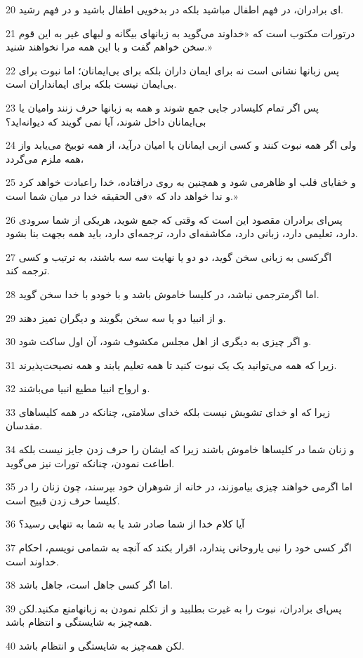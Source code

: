 \par 20 ‌ای برادران، در فهم اطفال مباشید بلکه در بدخویی اطفال باشید و در فهم رشید.
\par 21 درتورات مکتوب است که «خداوند می‌گوید به زبانهای بیگانه و لبهای غیر به این قوم سخن خواهم گفت و با این همه مرا نخواهند شنید.»
\par 22 پس زبانها نشانی است نه برای ایمان داران بلکه برای بی‌ایمانان؛ اما نبوت برای بی‌ایمان نیست بلکه برای ایمانداران است.
\par 23 پس اگر تمام کلیسادر جایی جمع شوند و همه به زبانها حرف زنند وامیان یا بی‌ایمانان داخل شوند، آیا نمی گویند که دیوانه‌اید؟
\par 24 ولی اگر همه نبوت کنند و کسی ازبی ایمانان یا امیان درآید، از همه توبیخ می‌یابد واز همه ملزم می‌گردد،
\par 25 و خفایای قلب او ظاهرمی شود و همچنین به روی درافتاده، خدا راعبادت خواهد کرد و ندا خواهد داد که «فی الحقیقه خدا در میان شما است.»
\par 26 پس‌ای برادران مقصود این است که وقتی که جمع شوید، هریکی از شما سرودی دارد، تعلیمی دارد، زبانی دارد، مکاشفه‌ای دارد، ترجمه‌ای دارد، باید همه بجهت بنا بشود.
\par 27 اگرکسی به زبانی سخن گوید، دو دو یا نهایت سه سه باشند، به ترتیب و کسی ترجمه کند.
\par 28 اما اگرمترجمی نباشد، در کلیسا خاموش باشد و با خودو با خدا سخن گوید.
\par 29 و از انبیا دو یا سه سخن بگویند و دیگران تمیز دهند.
\par 30 و اگر چیزی به دیگری از اهل مجلس مکشوف شود، آن اول ساکت شود.
\par 31 زیرا که همه می‌توانید یک یک نبوت کنید تا همه تعلیم یابند و همه نصیحت‌پذیرند.
\par 32 و ارواح انبیا مطیع انبیا می‌باشند.
\par 33 زیرا که او خدای تشویش نیست بلکه خدای سلامتی، چنانکه در همه کلیساهای مقدسان.
\par 34 و زنان شما در کلیساها خاموش باشند زیرا که ایشان را حرف زدن جایز نیست بلکه اطاعت نمودن، چنانکه تورات نیز می‌گوید.
\par 35 اما اگرمی خواهند چیزی بیاموزند، در خانه از شوهران خود بپرسند، چون زنان را در کلیسا حرف زدن قبیح است.
\par 36 آیا کلام خدا از شما صادر شد یا به شما به تنهایی رسید؟
\par 37 اگر کسی خود را نبی یاروحانی پندارد، اقرار بکند که آنچه به شمامی نویسم، احکام خداوند است.
\par 38 اما اگر کسی جاهل است، جاهل باشد.
\par 39 پس‌ای برادران، نبوت را به غیرت بطلبید و از تکلم نمودن به زبانهامنع مکنید.لکن همه‌چیز به شایستگی و انتظام باشد.
\par 40 لکن همه‌چیز به شایستگی و انتظام باشد.

